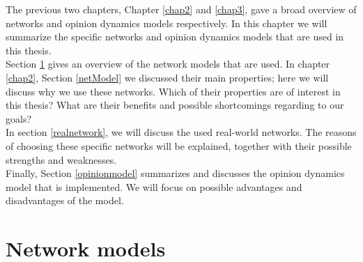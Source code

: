 \documentclass[11 pt , letterpaper , twoside , openright]{book}
\begin{document}
The previous two chapters, Chapter \ref{chap2} and \ref{chap3}, gave a broad overview of networks and opinion dynamics models respectively. In this chapter we will summarize the specific networks and opinion dynamics models that are used in this thesis. \\
\newline
Section \ref{networkmodel} gives an overview of the network models that are used. In chapter \ref{chap2}, Section \ref{netModel} we discussed their main properties; here we will discuss why we use these networks. Which of their properties are of interest in this thesis? What are their benefits and possible shortcomings regarding to our goals?\\
\newline
In section \ref{realnetwork}, we will discuss the used real-world networks. The reasons of choosing these specific networks will be explained, together with their possible strengths and weaknesses.\\ %
\newline
Finally, Section \ref{opinionmodel} summarizes and discusses the opinion dynamics model that is implemented. We will focus on possible advantages and disadvantages of the model.


\section{Network models}\label{networkmodel}
\end{document}
